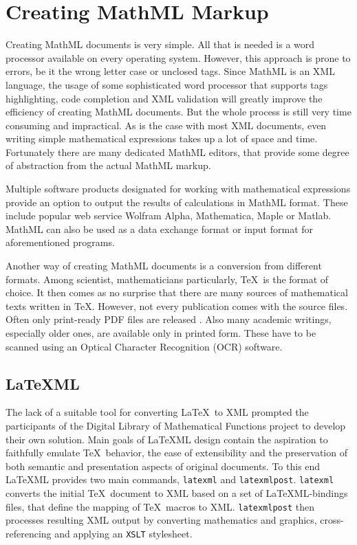 \documentclass[11pt,oneside,final]{fithesis2}
\begin{document}
\section{Creating MathML Markup}
\label{sec:create-mathml}
Creating MathML documents is very simple. All that is needed is a word processor available on every operating system. However, this approach is prone to errors, be it the wrong letter case or unclosed tags. Since MathML is an XML language, the usage of some sophisticated word processor that supports tags highlighting, code completion and XML validation will greatly improve the efficiency of creating MathML documents. But the whole process is still very time consuming and impractical. As is the case with most XML documents, even writing simple mathematical expressions takes up a lot of space and time. Fortunately there are many dedicated MathML editors, that provide some degree of abstraction from the actual MathML markup.

Multiple software products designated for working with mathematical expressions provide an option to output the results of calculations in MathML format. These include popular web service Wolfram Alpha, Mathematica, Maple or Matlab. MathML can also be used as a data exchange format or input format for aforementioned programs.

Another way of creating MathML documents is a conversion from different formats. Among scientist, mathematicians particularly, \TeX\ is the format of choice. It then comes as no surprise that there are many sources of mathematical texts written in \TeX. However, not every publication comes with the source files. Often only print-ready PDF files are released \cite{baker2011towards}. Also many academic writings, especially older ones, are available only in printed form. These have to be scanned using an Optical Character Recognition (OCR) software. 

\subsection{\LaTeX ML}
\label{section:latexml}
The lack of a suitable tool for converting \LaTeX\ to XML prompted the participants of the Digital Library of Mathematical Functions project to develop their own solution. Main goals of \LaTeX ML \cite{latexml:miller2013} design contain the aspiration to faithfully emulate \TeX\ behavior, the ease of extensibility and the preservation of both semantic and presentation aspects of original documents. To this end \LaTeX ML provides two main commands, \texttt{latexml} and \texttt{latexmlpost}. \texttt{latexml} converts the initial \TeX\ document to XML based on a set of \LaTeX ML-bindings files, that define the mapping of \TeX\ macros to XML. \texttt{latexmlpost} then processes resulting XML output by converting mathematics
and graphics, cross-referencing and applying an \texttt{XSLT} stylesheet. 
\end{document}
